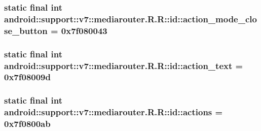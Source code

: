 \hypertarget{classandroid_1_1support_1_1v7_1_1mediarouter_1_1_r_1_1id_a7fdfd0898cbb59cce6ee5ce57342cc1}{
\subsubsection[{action\_\-mode\_\-close\_\-button}]{\setlength{\rightskip}{0pt plus 5cm}static final int android::support::v7::mediarouter.R.R::id::action\_\-mode\_\-close\_\-button = 0x7f080043}}
\label{classandroid_1_1support_1_1v7_1_1mediarouter_1_1_r_1_1id_a7fdfd0898cbb59cce6ee5ce57342cc1}


\hypertarget{classandroid_1_1support_1_1v7_1_1mediarouter_1_1_r_1_1id_3ceb48fd2b469181b1552c396d9ccbdd}{
\subsubsection[{action\_\-text}]{\setlength{\rightskip}{0pt plus 5cm}static final int android::support::v7::mediarouter.R.R::id::action\_\-text = 0x7f08009d}}
\label{classandroid_1_1support_1_1v7_1_1mediarouter_1_1_r_1_1id_3ceb48fd2b469181b1552c396d9ccbdd}


\hypertarget{classandroid_1_1support_1_1v7_1_1mediarouter_1_1_r_1_1id_0a2d999547e1819eeed38b962245baf4}{
\subsubsection[{actions}]{\setlength{\rightskip}{0pt plus 5cm}static final int android::support::v7::mediarouter.R.R::id::actions = 0x7f0800ab}}
\label{classandroid_1_1support_1_1v7_1_1mediarouter_1_1_r_1_1id_0a2d999547e1819eeed38b962245baf4}


